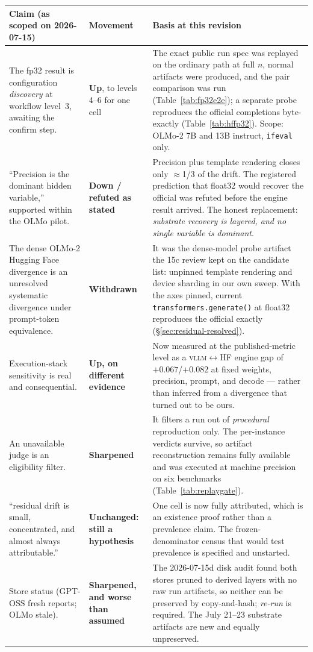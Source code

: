 \documentclass[11pt]{report}
\newcommand{\code}[1]{\texttt{#1}}
\begin{document}
\begin{longtable}{@{}p{}p{}p{}@{}}
\toprule
\textbf{Claim (as scoped on 2026-07-15)} & \textbf{Movement} & \textbf{Basis at this
revision} \\
\midrule
\endhead
The fp32 result is configuration \emph{discovery} at workflow level~3, awaiting the
confirm step. & \textbf{Up}, to levels 4--6 for one cell & The exact public run spec
was replayed on the ordinary path at full $n$, normal artifacts were produced, and
the pair comparison was run (Table~\ref{tab:fp32e2e}); a separate probe reproduces
the official completions byte-exactly (Table~\ref{tab:hffp32}). Scope: OLMo-2 7B and
13B instruct, \code{ifeval} only. \\
``Precision is the dominant hidden variable,'' supported within the OLMo pilot. &
\textbf{Down / refuted as stated} & Precision plus template rendering closes only
$\approx$1/3 of the drift. The registered prediction that float32 would recover the
official was refuted before the engine result arrived. The honest replacement:
\emph{substrate recovery is layered, and no single variable is dominant}. \\
The dense OLMo-2 Hugging Face divergence is an unresolved systematic divergence
under prompt-token equivalence. & \textbf{Withdrawn} & It was the dense-model probe
artifact the 15c review kept on the candidate list: unpinned template rendering and
device sharding in our own sweep. With the axes pinned, current
\code{transformers.generate()} at float32 reproduces the official exactly
(\S\ref{sec:residual-resolved}). \\
Execution-stack sensitivity is real and consequential. & \textbf{Up, on different
evidence} & Now measured at the published-metric level as a
\textsc{vllm}$\leftrightarrow$HF engine gap of $+0.067$/$+0.082$ at fixed weights,
precision, prompt, and decode --- rather than inferred from a divergence that turned
out to be ours. \\
An unavailable judge is an eligibility filter. & \textbf{Sharpened} & It filters a
run out of \emph{procedural} reproduction only. The per-instance verdicts survive,
so artifact reconstruction remains fully available and was executed at machine
precision on six benchmarks (Table~\ref{tab:replaygate}). \\
``residual drift is small, concentrated, and almost always attributable.'' &
\textbf{Unchanged: still a hypothesis} & One cell is now fully attributed, which is
an existence proof rather than a prevalence claim. The frozen-denominator census
that would test prevalence is specified and unstarted. \\
Store status (GPT-OSS fresh reports; OLMo stale). & \textbf{Sharpened, and worse
than assumed} & The 2026-07-15d disk audit found both stores pruned to derived
layers with no raw run artifacts, so neither can be preserved by copy-and-hash;
\emph{re-run} is required. The July 21--23 substrate artifacts are new and equally
unpreserved. \\
\bottomrule
\end{longtable}
\end{document}
